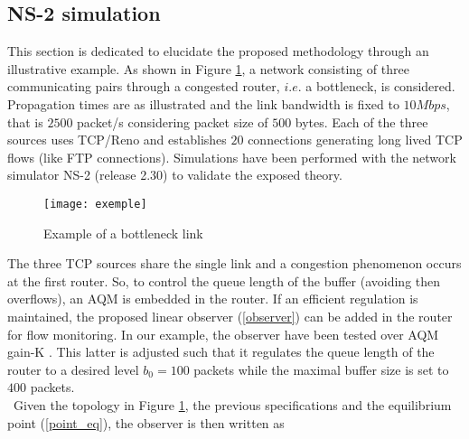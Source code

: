 \documentclass[a4paper, 10pt, onecolumn]{article}
\begin{document}
\subsection{NS-2 simulation}

This section is dedicated to elucidate the proposed methodology through an illustrative example. As shown in Figure \ref{exemple}, a network consisting of three communicating pairs through a congested router, $i.e.$ a bottleneck, is considered. Propagation times are as illustrated and the link bandwidth is fixed to $10Mbps$, that is $2500$ packet/s considering packet size of $500$ bytes. Each of the three sources uses TCP/Reno and establishes $20$ connections generating long lived TCP flows (like FTP connections). Simulations have been performed with the network simulator NS-2 \cite{Fal02} (release 2.30) to validate the exposed theory.

\begin{figure}[h]
       \centerline{\texttt{[image: exemple]}}
	\vspace*{-1cm}
       \caption{Example of a bottleneck link}
       \label{exemple}
\end{figure}


 The three TCP sources share the single link and a congestion phenomenon occurs at the first router. So, to control the queue length of the buffer (avoiding then overflows), an AQM is embedded in the router. If an efficient regulation is maintained, the proposed linear observer (\ref{observer}) can be added in the router for flow monitoring. In our example, the observer have been tested over AQM gain-K \cite{Lab07b}. This latter is adjusted such that it regulates the queue length of the router to a desired level $b_0=100$ packets while the maximal buffer size is set to $400$ packets.\\
~\indent Given the topology in Figure \ref{exemple}, the previous specifications and the equilibrium point (\ref{point_eq}), the observer is then written as
\end{document}
